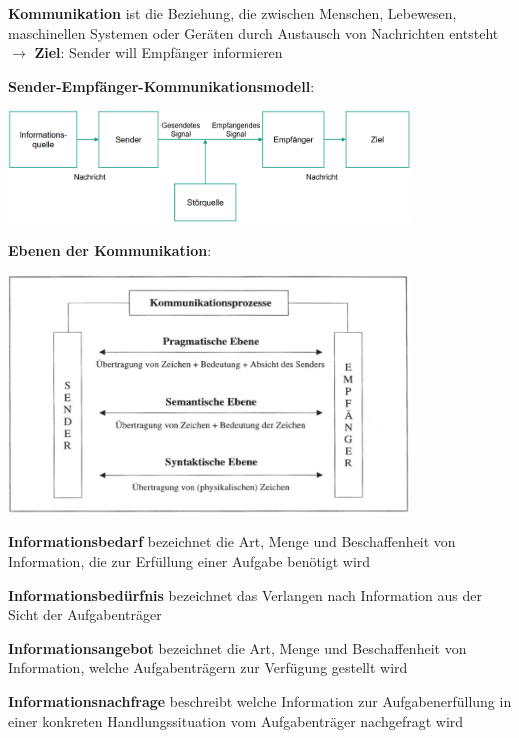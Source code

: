 \pagebreak
\textbf{Kommunikation} ist die Beziehung, die zwischen Menschen, Lebewesen, maschinellen Systemen oder Geräten durch Austausch von Nachrichten entsteht $\rightarrow$ \textbf{Ziel}: Sender will Empfänger informieren

\textbf{Sender-Empfänger-Kommunikationsmodell}:
\begin{center}
	\includegraphics[width=0.8\textwidth]{images/sue-modell.png}
\end{center}

\textbf{Ebenen der Kommunikation}:
\begin{center}
	\includegraphics[width=0.8\textwidth]{images/ebenen.png}
\end{center}

\textbf{Informationsbedarf} bezeichnet die Art, Menge und Beschaffenheit von Information, die zur Erfüllung einer Aufgabe benötigt wird

\textbf{Informationsbedürfnis} bezeichnet das Verlangen nach Information aus der Sicht der Aufgabenträger

\textbf{Informationsangebot} bezeichnet die Art, Menge und Beschaffenheit von Information, welche Aufgabenträgern zur Verfügung gestellt wird

\textbf{Informationsnachfrage} beschreibt welche Information zur Aufgabenerfüllung in einer konkreten Handlungssituation vom Aufgabenträger nachgefragt wird

